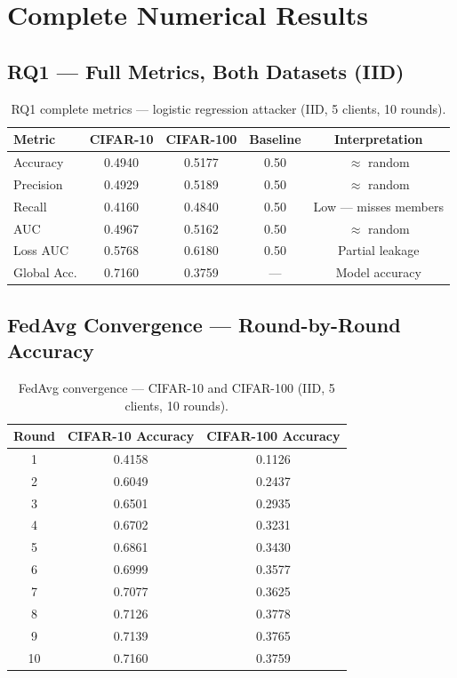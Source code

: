 \documentclass[12pt, a4paper]{report}
\begin{document}
\chapter{Complete Numerical Results}
\label{app:results}

\section{RQ1 --- Full Metrics, Both Datasets (IID)}
\begin{table}[H]
  \centering
  \caption{RQ1 complete metrics --- logistic regression attacker (IID, 5 clients, 10 rounds).}
  \begin{tabular}{lcccc}
    \toprule
    \textbf{Metric} & \textbf{CIFAR-10} & \textbf{CIFAR-100} & \textbf{Baseline} & \textbf{Interpretation} \\
    \midrule
    Accuracy    & 0.4940 & 0.5177 & 0.50 & $\approx$ random \\
    Precision   & 0.4929 & 0.5189 & 0.50 & $\approx$ random \\
    Recall      & 0.4160 & 0.4840 & 0.50 & Low --- misses members \\
    AUC         & 0.4967 & 0.5162 & 0.50 & $\approx$ random \\
    Loss AUC    & 0.5768 & 0.6180 & 0.50 & Partial leakage \\
    Global Acc. & 0.7160 & 0.3759 & ---  & Model accuracy \\
    \bottomrule
  \end{tabular}
\end{table}

\section{FedAvg Convergence --- Round-by-Round Accuracy}
\begin{table}[H]
  \centering
  \caption{FedAvg convergence --- CIFAR-10 and CIFAR-100 (IID, 5 clients, 10 rounds).}
  \begin{tabular}{ccc}
    \toprule
    \textbf{Round} & \textbf{CIFAR-10 Accuracy} & \textbf{CIFAR-100 Accuracy} \\
    \midrule
    1  & 0.4158 & 0.1126 \\
    2  & 0.6049 & 0.2437 \\
    3  & 0.6501 & 0.2935 \\
    4  & 0.6702 & 0.3231 \\
    5  & 0.6861 & 0.3430 \\
    6  & 0.6999 & 0.3577 \\
    7  & 0.7077 & 0.3625 \\
    8  & 0.7126 & 0.3778 \\
    9  & 0.7139 & 0.3765 \\
    10 & 0.7160 & 0.3759 \\
    \bottomrule
  \end{tabular}
\end{table}
\end{document}
